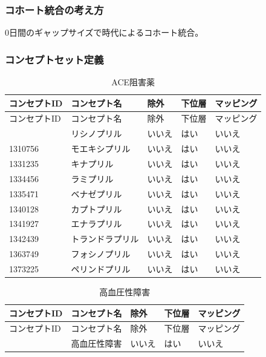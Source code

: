 \documentclass[
  11pt]{book}
\theoremstyle{definition}
\theoremstyle{definition}
\theoremstyle{definition}
\theoremstyle{definition}
\theoremstyle{remark}
\begin{document}
\subsubsection*{コホート統合の考え方}\label{ux30b3ux30dbux30fcux30c8ux7d71ux5408ux306eux8003ux3048ux65b9}

0日間のギャップサイズで時代によるコホート統合。

\subsubsection*{コンセプトセット定義}\label{ux30b3ux30f3ux30bbux30d7ux30c8ux30bbux30c3ux30c8ux5b9aux7fa9-1}

\begin{longtable}[]{@{}lllll@{}}
\caption{\label{tab:aceInhibitorsMono} ACE阻害薬}\tabularnewline
\toprule\noalign{}
コンセプトID & コンセプト名 & 除外 & 下位層 & マッピング \\
\midrule\noalign{}
\endfirsthead
\toprule\noalign{}
コンセプトID & コンセプト名 & 除外 & 下位層 & マッピング \\
\midrule\noalign{}
\endhead
\bottomrule\noalign{}
\endlastfoot
1308216 & リシノプリル & いいえ & はい & いいえ \\
1310756 & モエキシプリル & いいえ & はい & いいえ \\
1331235 & キナプリル & いいえ & はい & いいえ \\
1334456 & ラミプリル & いいえ & はい & いいえ \\
1335471 & ベナゼプリル & いいえ & はい & いいえ \\
1340128 & カプトプリル & いいえ & はい & いいえ \\
1341927 & エナラプリル & いいえ & はい & いいえ \\
1342439 & トランドラプリル & いいえ & はい & いいえ \\
1363749 & フォシノプリル & いいえ & はい & いいえ \\
1373225 & ペリンドプリル & いいえ & はい & いいえ \\
\end{longtable}

\begin{longtable}[]{@{}lllll@{}}
\caption{\label{tab:hypertensionAceMono} 高血圧性障害}\tabularnewline
\toprule\noalign{}
コンセプトID & コンセプト名 & 除外 & 下位層 & マッピング \\
\midrule\noalign{}
\endfirsthead
\toprule\noalign{}
コンセプトID & コンセプト名 & 除外 & 下位層 & マッピング \\
\midrule\noalign{}
\endhead
\bottomrule\noalign{}
\endlastfoot
316866 & 高血圧性障害 & いいえ & はい & いいえ \\
\end{longtable}
\end{document}
